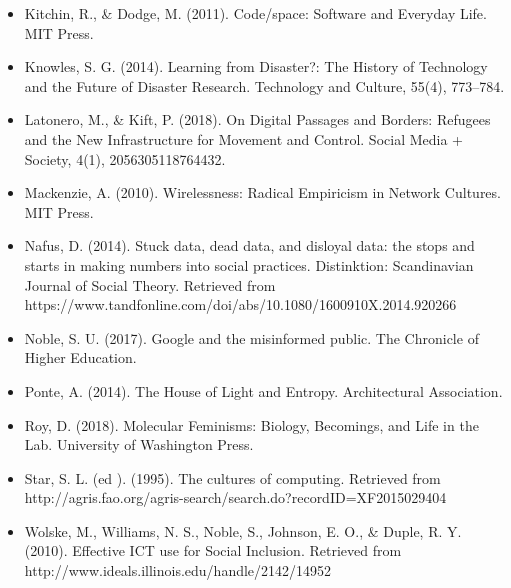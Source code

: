 \documentclass[a4paper,man,natbib]{apa6}
\begin{document}
\begin{itemize}[label={},itemindent=-2em,leftmargin=2em]
   \item Kitchin, R., \& Dodge, M. (2011). Code/space: Software and Everyday Life. MIT Press.

   \item Knowles, S. G. (2014). Learning from Disaster?: The History of Technology and the Future of Disaster Research. Technology and Culture, 55(4), 773–784.

   \item Latonero, M., \& Kift, P. (2018). On Digital Passages and Borders: Refugees and the New Infrastructure for Movement and Control. Social Media + Society, 4(1), 2056305118764432.

   \item Mackenzie, A. (2010). Wirelessness: Radical Empiricism in Network Cultures. MIT Press.

   \item Nafus, D. (2014). Stuck data, dead data, and disloyal data: the stops and starts in making numbers into social practices. Distinktion: Scandinavian Journal of Social Theory. Retrieved from https://www.tandfonline.com/doi/abs/10.1080/1600910X.2014.920266

   \item Noble, S. U. (2017). Google and the misinformed public. The Chronicle of Higher Education.

   \item Ponte, A. (2014). The House of Light and Entropy. Architectural Association.

   \item Roy, D. (2018). Molecular Feminisms: Biology, Becomings, and Life in the Lab. University of Washington Press.

   \item Star, S. L. (ed ). (1995). The cultures of computing. Retrieved from http://agris.fao.org/agris-search/search.do?recordID=XF2015029404

   \item Wolske, M., Williams, N. S., Noble, S., Johnson, E. O., \& Duple, R. Y. (2010). Effective ICT use for Social Inclusion. Retrieved from http://www.ideals.illinois.edu/handle/2142/14952

   \end{itemize}

   \setlength{\parindent}{4em}
   
\end{document}
